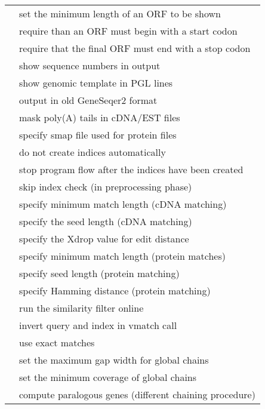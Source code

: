 \begin{supertabular}{ll}
\\
& set the minimum length of an ORF to be shown
\\
& require than an ORF must begin with a start codon
\\
& require that the final ORF must end with a stop codon
\\
& show sequence numbers in output
\\
& show genomic template in PGL lines
\\
& output in old GeneSeqer2 format
\\
& mask poly(A) tails in cDNA/EST files
\\
& specify smap file used for protein files
\\
& do not create indices automatically
\\
& stop program flow after the indices have been created
\\
& skip index check (in preprocessing phase)
\\
& specify minimum match length (cDNA matching)
\\
& specify the seed length (cDNA matching)
\\
& specify the Xdrop value for edit distance
\\
& specify minimum match length (protein matches)
\\
& specify seed length (protein matching)
\\
& specify Hamming distance (protein matching)
\\
& run the similarity filter online
\\
& invert query and index in vmatch call
\\
& use exact matches
\\
& set the maximum gap width for global chains
\\
& set the minimum coverage of global chains
\\
& compute paralogous genes (different chaining procedure)
\\

\end{supertabular}
